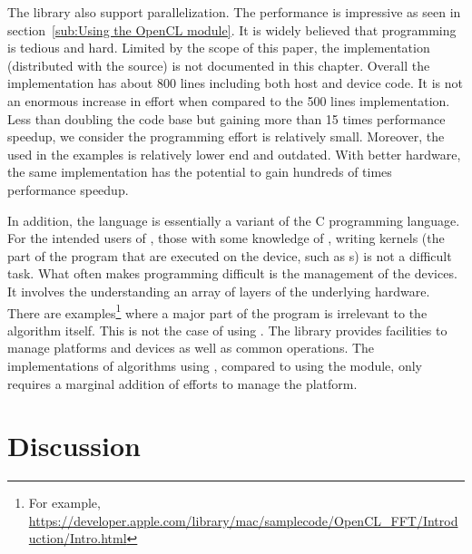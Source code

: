 The library also support \opencl parallelization. The performance is
impressive as seen in section~\ref{sub:Using the OpenCL module}. It is widely
believed that \opencl programming is tedious and hard. Limited by the scope of
this paper, the \opencl implementation (distributed with the \vsmc source) is
not documented in this chapter. Overall the \opencl implementation has about
800 lines including both host and device code. It is not an enormous increase
in effort when compared to the 500 lines \smp implementation. Less than
doubling the code base but gaining more than 15 times performance speedup, we
consider the programming effort is relatively small. Moreover, the \gpu used
in the examples is relatively lower end and outdated. With better hardware,
the same implementation has the potential to gain hundreds of times
performance speedup.

In addition, the \opencl language is essentially a variant of the C
programming language. For the intended users of \vsmc, those with some
knowledge of \cpp, writing \opencl kernels (the part of the program that are
executed on the device, such as \gpu{}s) is not a difficult task. What often
makes \opencl programming difficult is the management of the devices. It
involves the understanding an array of layers of the underlying hardware.
There are examples\footnote{For example,
  \url{https://developer.apple.com/library/mac/samplecode/OpenCL_FFT/Introduction/Intro.html}}
where a major part of the program is irrelevant to the algorithm itself. This
is not the case of using \vsmc. The library provides facilities to manage
\opencl platforms and devices as well as common operations. The
implementations of \smc algorithms using \opencl, compared to using the \smp
module, only requires a marginal addition of efforts to manage the \opencl
platform.

\section{Discussion}
\label{sec:vSMC Discussion}

